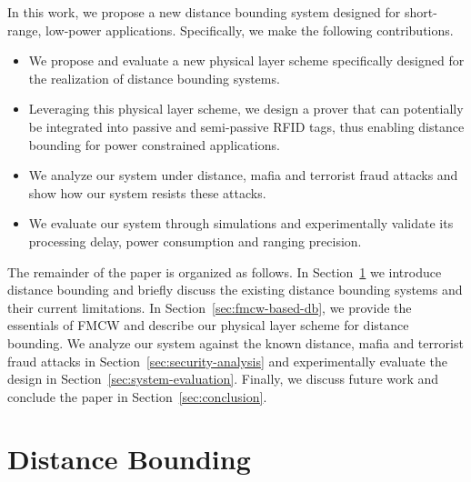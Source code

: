 \documentclass{sig-alternate-10pt}
\begin{document}
In this work, we propose a new distance bounding system designed for
short-range, low-power applications. Specifically, we make the following
contributions.
\begin{itemize}
\item We propose and evaluate a new physical layer sche\-me specifically designed
  for the realization of distance bounding systems.
\item Leveraging this physical layer scheme, we design a prover that can
  potentially be integrated into passive and semi-passive RFID tags, thus
  enabling distance bounding for power constrained applications.
\item We analyze our system under distance, mafia and terrorist fraud attacks
  and show how our system resists these attacks.
\item We evaluate our system through simulations and experimentally validate its
  processing delay, power consumption and ranging precision.
\end{itemize}

The remainder of the paper is organized as follows. In
Section~\ref{sec:db-background} we introduce distance bounding and briefly
discuss the existing distance bounding systems and their current limitations. In
Section~\ref{sec:fmcw-based-db}, we provide the essentials of FMCW and describe
our physical layer scheme for distance bounding. We analyze our system against
the known distance, mafia and terrorist fraud attacks in
Section~\ref{sec:security-analysis} and experimentally evaluate the design in
Section~\ref{sec:system-evaluation}. Finally, we discuss future work and
conclude the paper in Section~\ref{sec:conclusion}.

\section{Distance Bounding}
\label{sec:db-background}
\end{document}
